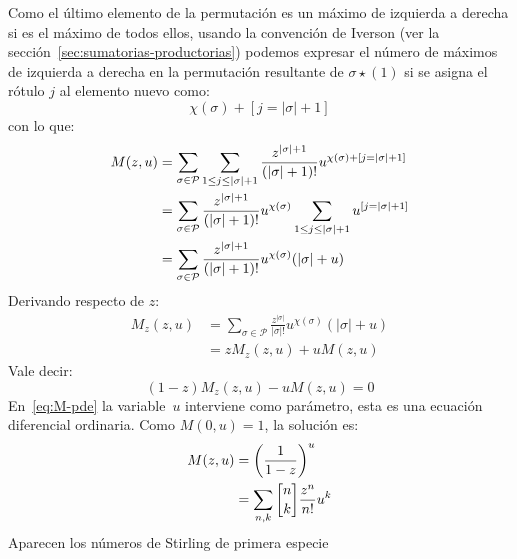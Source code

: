   Como el último elemento de la permutación
  es un máximo de izquierda a derecha
  si es el máximo de todos ellos,
  usando la convención de Iverson%
  (ver la sección~\ref{sec:sumatorias-productorias})
  podemos expresar el número de máximos de izquierda a derecha
  en la permutación resultante de \(\sigma \star (1)\)
  si se asigna el rótulo \(j\) al elemento nuevo como:
  \begin{equation}
    \label{eq:chi+1}
    \chi(\sigma) + [j = \lvert \sigma \rvert + 1]
  \end{equation}
  con lo que:
  \begin{align}
    M(z, u)
      &= \sum_{\sigma \in \mathcal{P}}
	   \sum_{1 \le j \le \lvert \sigma \rvert + 1}
	     \frac{z^{\lvert \sigma \rvert + 1}}{(\lvert \sigma \rvert + 1)!}
	       u^{\chi(\sigma) + [j = \lvert \sigma \rvert + 1]}
		  \label{eq:M-decomposed} \\
      &= \sum_{\sigma \in \mathcal{P}}
	   \frac{z^{\lvert \sigma \rvert + 1}}{(\lvert \sigma \rvert + 1)!}
	      u^{\chi(\sigma)}
	   \sum_{1 \le j \le \lvert \sigma \rvert + 1}
	     u^{[j = \lvert \sigma \rvert + 1]}
		  \notag  \\
      &= \sum_{\sigma \in \mathcal{P}}
	   \frac{z^{\lvert \sigma \rvert + 1}}{(\lvert \sigma \rvert + 1)!}
	      u^{\chi(\sigma)} (\lvert \sigma \rvert + u)
		  \label{eq:M-decomposed-result}
  \end{align}
  Derivando respecto de \(z\):
  \begin{align*}
    M_z(z, u)
      &= \sum_{\sigma \in \mathcal{P}}
	   \frac{z^{\lvert \sigma \rvert}}{\lvert \sigma \rvert !}
	   u^{\chi(\sigma)}
	   (\lvert \sigma \rvert + u) \\
      &= z M_z(z, u) + u M(z, u)
  \end{align*}
  Vale decir:
  \begin{equation}
    \label{eq:M-pde}
    (1 - z) M_z(z, u) - u M(z, u)
      = 0
  \end{equation}
  En~\eqref{eq:M-pde} la variable~\(u\) interviene como parámetro,
  esta es una ecuación diferencial ordinaria.
  Como \(M(0, u) = 1\),
  la solución es:
  \begin{align}
    M(z, u)
      &= \left( \frac{1}{1 - z} \right)^u
	    \label{eq:M-solution} \\
      &= \sum_{n, k} \cycle{n}{k} \frac{z^n}{n!} u^k
	    \label{eq:M-solution-Stirling1}
  \end{align}
  Aparecen los números de Stirling de primera especie~%
